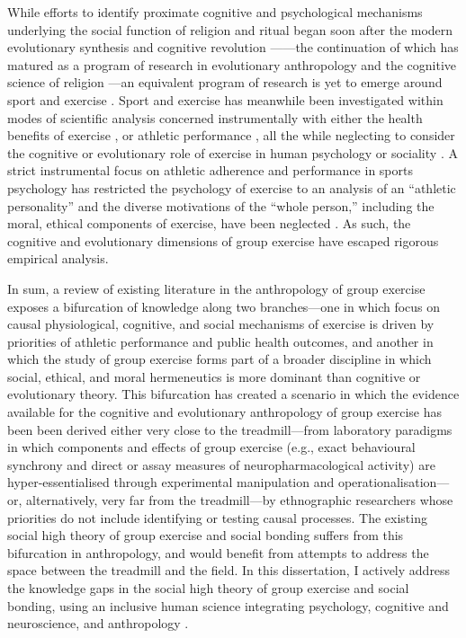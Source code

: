 While efforts to identify proximate cognitive and psychological mechanisms underlying the social function of religion and ritual began soon after the modern evolutionary synthesis \citep{Huxley1942} and cognitive revolution \citep[e.g.,][]{Turner1986,1987}—---the continuation of which has matured as a program of research in evolutionary anthropology and the cognitive science of religion \citep{Barrett2002,Lawson1993,Sperber1996,Whitehouse2004}---an equivalent program of research is yet to emerge around sport and exercise \citep{Blanchard1995,Downey2005a}.  Sport and exercise has meanwhile been investigated within modes of scientific analysis concerned instrumentally with either the health benefits of exercise \citep{Fiuza-Luces2013,Morris1994}, or athletic performance \citep{Beedie2015a}, all the while neglecting to consider the cognitive or evolutionary role of exercise in human psychology or sociality \citep{Balish2013,Coulter2015}. A strict instrumental focus on athletic adherence and performance in sports psychology has restricted the psychology of exercise to an analysis of an ``athletic personality'' and the diverse motivations of the ``whole person,'' including the moral, ethical components of exercise, have been neglected \citep{Coulter2015,Laborde2014}.  As such, the cognitive and evolutionary dimensions of group exercise have escaped rigorous empirical analysis.

In sum, a review of existing literature in the anthropology of group exercise exposes a bifurcation of knowledge along two branches---one in which focus on causal physiological, cognitive, and social mechanisms of exercise is driven by priorities of athletic performance and public health outcomes, and another in which the study of group exercise forms part of a broader discipline in which social, ethical, and moral hermeneutics is more dominant than cognitive or evolutionary theory.  This bifurcation has created a scenario in which the evidence available for the cognitive and evolutionary anthropology of group exercise has been been derived either very close to the treadmill---from laboratory paradigms in which components and effects of group exercise (e.g., exact behavioural synchrony and direct or assay measures of neuropharmacological activity) are hyper-essentialised through experimental manipulation and operationalisation---or, alternatively, very far from the treadmill---by ethnographic researchers whose priorities do not include identifying or testing causal processes.  The existing social high theory of group exercise and social bonding suffers from this bifurcation in anthropology, and would benefit from attempts to address the space between the treadmill and the field.  In this dissertation, I actively address the knowledge gaps in the social high theory of group exercise and social bonding, using an inclusive human science integrating psychology, cognitive and neuroscience, and anthropology \citep{Whitehouse2012,Downey2014}.





